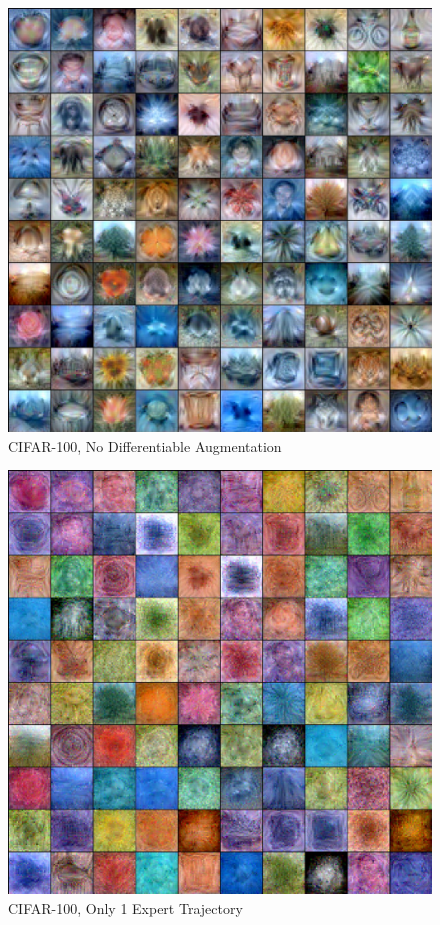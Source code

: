 \begin{figure}
    \centering
    \includegraphics[width=\linewidth]{figures/cifar100-noaug.pdf}
    \caption{CIFAR-100, No Differentiable Augmentation}
    \label{fig:noaug}
\end{figure}
\begin{figure}
    \centering
    \includegraphics[width=\linewidth]{figures/cifar100-single.pdf}
    \caption{CIFAR-100, Only 1 Expert Trajectory}
    \label{fig:1exp}
\end{figure}

